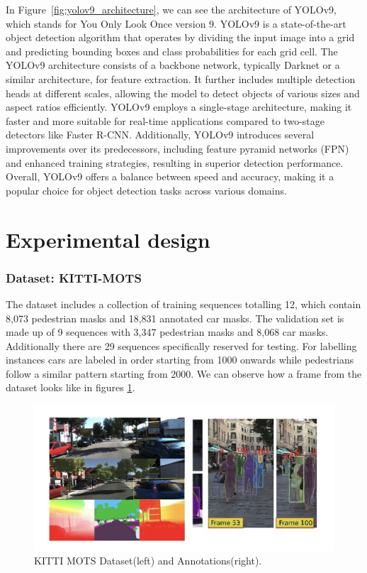 \documentclass{IEEEtran}
\begin{document}
	
	In Figure~\ref{fig:yolov9_architecture}, we can see the architecture of YOLOv9, which stands for You Only Look Once version 9. YOLOv9 is a state-of-the-art object detection algorithm that operates by dividing the input image into a grid and predicting bounding boxes and class probabilities for each grid cell. The YOLOv9 architecture consists of a backbone network, typically Darknet or a similar architecture, for feature extraction. It further includes multiple detection heads at different scales, allowing the model to detect objects of various sizes and aspect ratios efficiently. YOLOv9 employs a single-stage architecture, making it faster and more suitable for real-time applications compared to two-stage detectors like Faster R-CNN. Additionally, YOLOv9 introduces several improvements over its predecessors, including feature pyramid networks (FPN) and enhanced training strategies, resulting in superior detection performance. Overall, YOLOv9 offers a balance between speed and accuracy, making it a popular choice for object detection tasks across various domains.
	
	
	\section{Experimental design}
	\subsubsection{Dataset: KITTI-MOTS}
	
	The dataset includes a collection of training sequences totalling 12, which contain 8,073 pedestrian masks and 18,831 annotated car masks. The validation set is made up of 9 sequences with 3,347 pedestrian masks and 8,068 car masks. Additionally there are 29 sequences specifically reserved for testing. For labelling instances cars are labeled in order starting from 1000 onwards while pedestrians follow a similar pattern starting from 2000.
	We can observe how a frame from the dataset looks like in figures \ref{fig:kitti_dataset}.
	
	\begin{figure}
		\centering
		\includegraphics[width=0.8\linewidth]{images/kitti_dataset.png}
		\caption{KITTI MOTS Dataset(left) and Annotations(right).}
		\label{fig:kitti_dataset}
	\end{figure}
	
\end{document}
